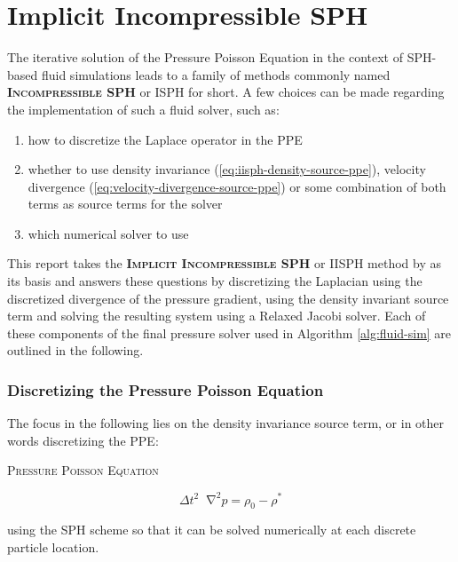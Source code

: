 \documentclass[oneside, a4paper]{book}
\newcommand\emphasis[1]{{\scshape\bfseries#1}}
\newcommand{\equationnamed}[2]{%
  \setlength{\fboxsep}{2pt} %
  \setlength{\fboxrule}{0.01pt}
  \begin{center}
    \begin{minipage}{\textwidth}
      \begin{center}\textsc{#1}\end{center}
      #2
    \end{minipage}
  \end{center}
}
\newcommand*\Laplace{\mathop{}\!\mathbin\nabla^2}
\begin{document}
    \section{Implicit Incompressible SPH}
    The iterative solution of the Pressure Poisson Equation in the context of SPH-based fluid simulations leads to a family of methods commonly named \emphasis{Incompressible SPH} or ISPH for short. A few choices can be made regarding the implementation of such a fluid solver, such as:
    \begin{enumerate}
      \item how to discretize the Laplace operator in the PPE \autocite{fuerstenau-laplace-discretization-comparison}
      \item whether to use density invariance (\autoref{eq:iisph-density-source-ppe})\autocite{iisph}, velocity divergence (\autoref{eq:velocity-divergence-source-ppe}) or some combination of both terms \autocites{dfsph}{optimized-source-term} as source terms for the solver
      \item which numerical solver to use
    \end{enumerate}

    This report takes the \emphasis{Implicit Incompressible SPH} or IISPH method by \autocite[Ihmsen et al.]{iisph} as its basis and answers these questions by discretizing the Laplacian using the discretized divergence of the pressure gradient, using the density invariant source term and solving the resulting system using a Relaxed Jacobi solver. Each of these components of the final pressure solver used in Algorithm \ref{alg:fluid-sim} are outlined in the following.
    
    \subsubsection{Discretizing the Pressure Poisson Equation}\label{subsec:discretizing-the-ppe}
    The focus in the following lies on the density invariance source term, or in other words discretizing the PPE:
    \equationnamed{Pressure Poisson Equation}{
      \begin{equation}
        \Delta t^2 \Laplace p = \rho_0-\rho^*
      \end{equation}
    }
    
    using the SPH scheme so that it can be solved numerically at each discrete particle location.
\end{document}
